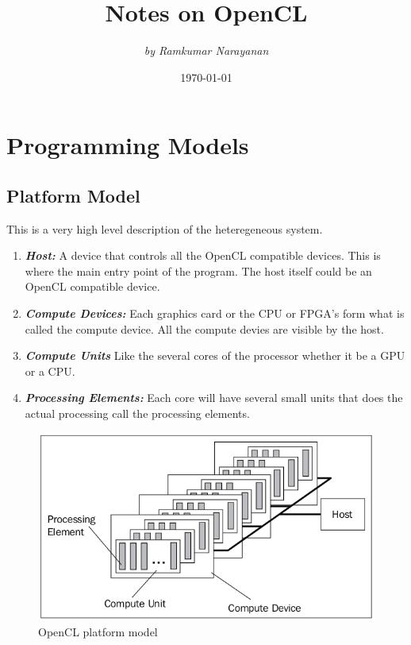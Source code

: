 \documentclass[10pt]{article}
\begin{document}
 
\title{\Huge \bsifamily Notes on OpenCL}
\author{\textit{by Ramkumar Narayanan}}
\date{}
\maketitle 
\tableofcontents
\newpage

\date{\today}
\section{Programming Models}
\subsection{Platform Model}
This is a very high level description of the heteregeneous system. 
\begin{enumerate}
	\item \textbf{\textit{Host:}} A device that controls all the OpenCL compatible devices. This is where the main entry point of the program. The host itself could be an OpenCL compatible device.
	\item \textbf{\textit{Compute Devices:}} Each graphics card or the CPU or FPGA's form what is called the compute device. All the compute devies are visible by the host.
	\item \textbf{\textit{Compute Units}} Like the several cores of the processor whether it be a GPU or a CPU. 
	\item \textbf{\textit{Processing Elements:}} Each core will have several small units that does the actual processing call the processing elements.
\end{enumerate}

\begin{figure}[ht]
  \centering
  \includegraphics[scale=0.4]{./images/platform_model.png}
  \caption{OpenCL platform model}
  \label{platform_model}
\end{figure}
\end{document}
